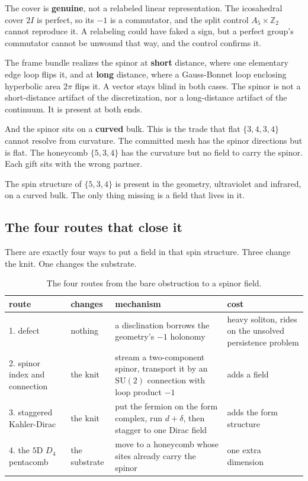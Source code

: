 The cover is \textbf{genuine}, not a relabeled linear representation. The icosahedral cover $2I$ is perfect, so
its $-1$ is a commutator, and the split control $A_5 \times \mathbb{Z}_2$ cannot reproduce it. A relabeling could
have faked a sign, but a perfect group's commutator cannot be unwound that way, and the control confirms it.

The frame bundle realizes the spinor at \textbf{short} distance, where one elementary edge loop flips it, and at
\textbf{long} distance, where a Gauss-Bonnet loop enclosing hyperbolic area $2\pi$ flips it. A vector stays blind
in both cases. The spinor is not a short-distance artifact of the discretization, nor a long-distance artifact of
the continuum. It is present at both ends.

And the spinor sits on a \textbf{curved} bulk. This is the trade that flat $\{3,4,3,4\}$ cannot resolve from
curvature. The committed mesh has the spinor directions but is flat. The honeycomb $\{5,3,4\}$ has the curvature
but no field to carry the spinor. Each gift sits with the wrong partner.

\begin{result}
The spin structure of $\{5,3,4\}$ is present in the geometry, ultraviolet and infrared, on a curved bulk. The
only thing missing is a field that lives in it.
\end{result}

\subsection{The four routes that close it}

There are exactly four ways to put a field in that spin structure. Three change the knit. One changes the
substrate.

\begin{table}[ht]
\centering
\begin{tabular}{@{}p{}p{}p{}p{}@{}}
\toprule
route & changes & mechanism & cost \\
\midrule
1. defect & nothing & a disclination borrows the geometry's $-1$ holonomy & heavy soliton, rides on the unsolved persistence problem \\
2. spinor index and connection & the knit & stream a two-component spinor, transport it by an $\mathrm{SU}(2)$ connection with loop product $-1$ & adds a field \\
3. staggered Kahler-Dirac & the knit & put the fermion on the form complex, run $d + \delta$, then stagger to one Dirac field & adds the form structure \\
4. the $5$D $D_4$ pentacomb & the substrate & move to a honeycomb whose sites already carry the spinor & one extra dimension \\
\bottomrule
\end{tabular}
\caption{The four routes from the bare obstruction to a spinor field.}
\label{tab:534-four-routes}
\end{table}

